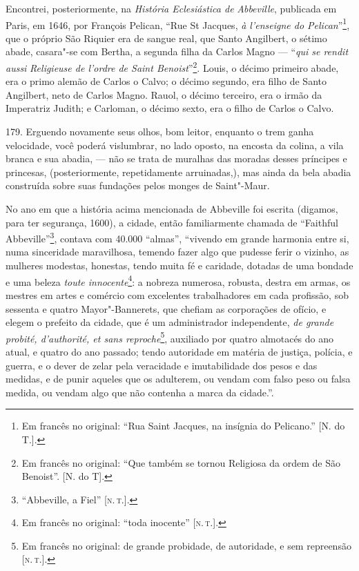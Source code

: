 Encontrei, posteriormente, na \emph{História Eclesiástica de}
\emph{Abbeville}, publicada em Paris, em 1646, por François Pelican,
``Rue St Jacques, \emph{à l'enseigne do Pelican}''\footnote{Em francês
  no original: ``Rua Saint Jacques, na insígnia do Pelicano.'' {[}N. do
  T.{]}.}, que o próprio São Riquier era de sangue real, que Santo
Angilbert, o sétimo abade, casara"-se com Bertha, a segunda filha da
Carlos Magno --- ``\emph{qui se rendit aussi} \emph{Religieuse de l'ordre
de Saint Benoist}''\footnote{Em francês no original: ``Que também se
  tornou Religiosa da ordem de São Benoist''. {[}N. do T{]}.}. Louis, o
décimo primeiro abade, era o primo alemão de Carlos o Calvo; o décimo
segundo, era filho de Santo Angilbert, neto de Carlos Magno. Rauol, o
décimo terceiro, era o irmão da Imperatriz Judith; e Carloman, o décimo
sexto, era o filho de Carlos o Calvo.

179. Erguendo novamente seus olhos, bom leitor, enquanto o trem ganha
velocidade, você poderá vislumbrar, no lado oposto, na encosta da
colina, a vila branca e sua abadia, --- não se trata de muralhas das
moradas desses príncipes e princesas, (posteriormente, repetidamente
arruinadas,), mas ainda da bela abadia construída sobre suas fundações
pelos monges de Saint"-Maur.

No ano em que a história acima mencionada de Abbeville foi escrita
(digamos, para ter segurança, 1600), a cidade, então familiarmente
chamada de ``Faithful Abbeville''\footnote{``Abbeville, a Fiel'' {[}\textsc{n.\,t.}{]}.}, contava com 40.000 ``almas'', ``vivendo em grande harmonia
entre si, numa sinceridade maravilhosa, temendo fazer algo que pudesse
ferir o vizinho, as mulheres modestas, honestas, tendo muita fé e
caridade, dotadas de uma bondade e uma beleza \emph{toute
innocente}\footnote{Em francês no original: ``toda inocente'' {[}\textsc{n.\,t.}{]}.}: a nobreza numerosa, robusta, destra em armas, os mestres em
artes e comércio com excelentes trabalhadores em cada profissão, sob
sessenta e quatro Mayor"-Bannerets, que chefiam as corporações de ofício,
e elegem o prefeito da cidade, que é um administrador independente,
\emph{de grande probité, d'authorité, et sans reproche}\footnote{Em
  francês no original: de grande probidade, de autoridade, e sem
  repreensão {[}\textsc{n.\,t.}{]}.}, auxiliado por quatro almotacés do ano
atual, e quatro do ano passado; tendo autoridade em matéria de justiça,
polícia, e guerra, e o dever de zelar pela veracidade e imutabilidade
dos pesos e das medidas, e de punir aqueles que os adulterem, ou vendam
com falso peso ou falsa medida, ou vendam algo que não contenha a marca
da cidade.''.

